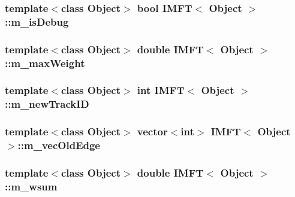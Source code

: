 \hypertarget{class_i_m_f_t_af10936c7ab5ea0b0d18e928365c6ff3d}{
\subsubsection[{m\-\_\-is\-Debug}]{\setlength{\rightskip}{0pt plus 5cm}template$<$class \-Object$>$ bool {\bf \-I\-M\-F\-T}$<$ \-Object $>$\-::{\bf m\-\_\-is\-Debug}}}\label{class_i_m_f_t_af10936c7ab5ea0b0d18e928365c6ff3d}
\hypertarget{class_i_m_f_t_a157d578f41bcddf7355c9d0fc16c0f6e}{
\subsubsection[{m\-\_\-max\-Weight}]{\setlength{\rightskip}{0pt plus 5cm}template$<$class \-Object$>$ double {\bf \-I\-M\-F\-T}$<$ \-Object $>$\-::{\bf m\-\_\-max\-Weight}}}\label{class_i_m_f_t_a157d578f41bcddf7355c9d0fc16c0f6e}
\hypertarget{class_i_m_f_t_a1fbf73806f8ad8cc86261808f7c4ec09}{
\subsubsection[{m\-\_\-new\-Track\-I\-D}]{\setlength{\rightskip}{0pt plus 5cm}template$<$class \-Object$>$ int {\bf \-I\-M\-F\-T}$<$ \-Object $>$\-::{\bf m\-\_\-new\-Track\-I\-D}}}\label{class_i_m_f_t_a1fbf73806f8ad8cc86261808f7c4ec09}
\hypertarget{class_i_m_f_t_a29f477074ca9cb6760c58c7312a0e2c6}{
\subsubsection[{m\-\_\-vec\-Old\-Edge}]{\setlength{\rightskip}{0pt plus 5cm}template$<$class \-Object$>$ vector$<$int$>$ {\bf \-I\-M\-F\-T}$<$ \-Object $>$\-::{\bf m\-\_\-vec\-Old\-Edge}}}\label{class_i_m_f_t_a29f477074ca9cb6760c58c7312a0e2c6}
\hypertarget{class_i_m_f_t_ac759c0713923c5a609ec3e90b942f606}{
\subsubsection[{m\-\_\-wsum}]{\setlength{\rightskip}{0pt plus 5cm}template$<$class \-Object$>$ double {\bf \-I\-M\-F\-T}$<$ \-Object $>$\-::{\bf m\-\_\-wsum}}}\label{class_i_m_f_t_ac759c0713923c5a609ec3e90b942f606}
